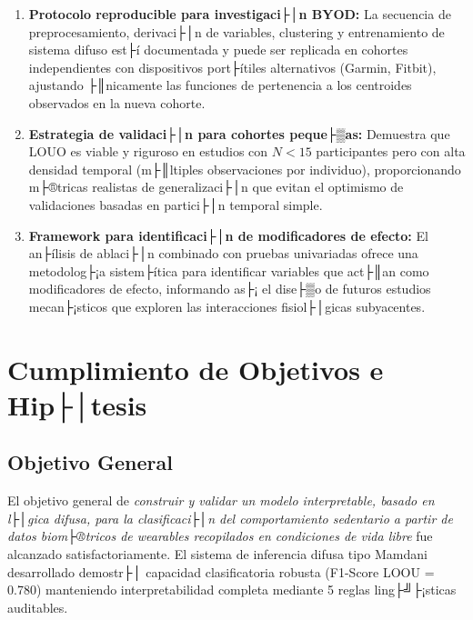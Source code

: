 \begin{enumerate}
    \item \textbf{Protocolo reproducible para investigaci├│n BYOD:} La secuencia de preprocesamiento, derivaci├│n de variables, clustering y entrenamiento de sistema difuso est├í documentada y puede ser replicada en cohortes independientes con dispositivos port├ítiles alternativos (Garmin, Fitbit), ajustando ├║nicamente las funciones de pertenencia a los centroides observados en la nueva cohorte.
    
    \item \textbf{Estrategia de validaci├│n para cohortes peque├▒as:} Demuestra que LOUO es viable y riguroso en estudios con $N < 15$ participantes pero con alta densidad temporal (m├║ltiples observaciones por individuo), proporcionando m├®tricas realistas de generalizaci├│n que evitan el optimismo de validaciones basadas en partici├│n temporal simple.
    
    \item \textbf{Framework para identificaci├│n de modificadores de efecto:} El an├ílisis de ablaci├│n combinado con pruebas univariadas ofrece una metodolog├¡a sistem├ítica para identificar variables que act├║an como modificadores de efecto, informando as├¡ el dise├▒o de futuros estudios mecan├¡sticos que exploren las interacciones fisiol├│gicas subyacentes.
\end{enumerate}


\section{Cumplimiento de Objetivos e Hip├│tesis}
\label{sec:cumplimiento}

\subsection{Objetivo General}
\label{subsec:cumplimiento_og}

El objetivo general de \textit{construir y validar un modelo interpretable, basado en l├│gica difusa, para la clasificaci├│n del comportamiento sedentario a partir de datos biom├®tricos de wearables recopilados en condiciones de vida libre} fue alcanzado satisfactoriamente. El sistema de inferencia difusa tipo Mamdani desarrollado demostr├│ capacidad clasificatoria robusta (F1-Score LOOU = 0.780) manteniendo interpretabilidad completa mediante 5 reglas ling├╝├¡sticas auditables.

